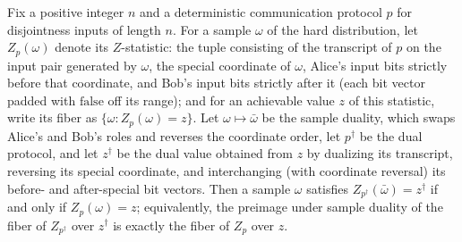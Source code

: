 \begin{theorem}
\label{CommunicationComplexity.Functions.Disjointness.RandomizedLowerBound.zVariable_dualProtocol_preimage_dualZValue}
\leanok
{}
Fix a positive integer $n$ and a deterministic communication protocol $p$ for
disjointness inputs of length $n$. For a sample $\omega$ of the hard distribution, let
$Z_p(\omega)$ denote its $Z$-statistic: the tuple consisting of the transcript of $p$ on
the input pair generated by $\omega$, the special coordinate of $\omega$, Alice's input
bits strictly before that coordinate, and Bob's input bits strictly after it (each bit
vector padded with $\mathrm{false}$ off its range); and for an achievable value $z$ of
this statistic, write its fiber as $\{\omega : Z_p(\omega) = z\}$. Let $\omega \mapsto
\bar\omega$ be the sample duality, which swaps Alice's and Bob's roles and reverses the
coordinate order, let $p^\dagger$ be the dual protocol, and let $z^\dagger$ be the dual
value obtained from $z$ by dualizing its transcript, reversing its special coordinate,
and interchanging (with coordinate reversal) its before- and after-special bit vectors.
Then a sample $\omega$ satisfies $Z_{p^\dagger}(\bar\omega) = z^\dagger$ if and only if
$Z_p(\omega) = z$; equivalently, the preimage under sample duality of the fiber of
$Z_{p^\dagger}$ over $z^\dagger$ is exactly the fiber of $Z_p$ over $z$.
\end{theorem}

